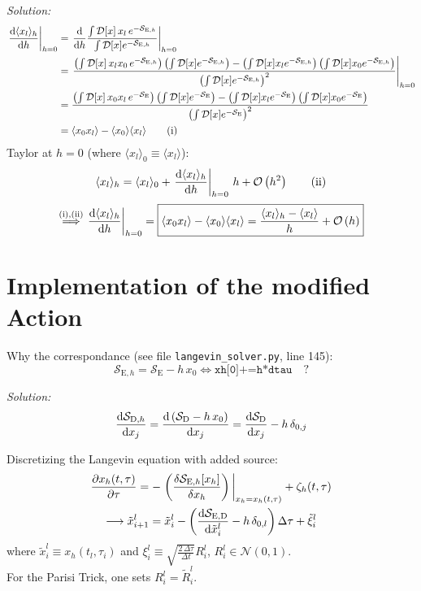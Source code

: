 \documentclass[11pt,a4paper]{scrartcl}
\newcommand{\SD}{\ensuremath{\mathcal{S}_{\mathrm{D}}}}
\newcommand{\SDh}{\mathcal{S}_{\mathrm{D},h}}
\newcommand{\avg}[1]{\langle#1\rangle}
\newcommand{\SE}{\mathcal{S}_{\mathrm{E}}}
\newcommand{\SEh}{\mathcal{S}_{\mathrm{E},h}}
\newcommand{\pathinth}[1]{\int\mathcal{D}[x]#1e^{-\SEh}}
\newcommand{\pathint}[1]{\int\mathcal{D}[x]#1e^{-\SE}}
\newcommand{\BigO}[1]{\mathcal{O}\left(#1\right)}
\newcommand{\SED}{\mathcal{S}_{\mathrm{E,D}}}
\newcommand{\xt}{\ensuremath{\tilde{x}}}
\newcommand{\xh}{\ensuremath{x_{h}}}
\begin{document}
\emph{Solution:}
\begin{align*}
    \eval{\dv{\avg{x_l}_h}{h}}_{h=0} &=
    \eval{\dv{h}\frac{\pathinth{\,x_l\,}}{\pathinth{}}}_{h=0} \\ &=
    \eval{\frac{\left(\pathinth{\,x_l x_0\,}\right)\left(\pathinth{}\right)
    -\left(\pathinth{x_l}\right)\left(\pathinth{x_0}\right)}
    {\left(\pathinth{}\right)^2}}_{h=0} \\ &=
    \frac{\left(\pathint{\,x_0 x_l\,}\right)\left(\pathint{}\right)
    -\left(\pathint{x_l}\right)\left(\pathint{x_0}\right)}
    {\left(\pathint{}\right)^2} \\ &=
    \avg{x_0 x_l}-\avg{x_0}\avg{x_l} \tag{i}
\end{align*}
Taylor at $h=0$ (where $\avg{x_l}_0\equiv\avg{x_l}$):
\begin{equation*}
    \avg{x_l}_h=\avg{x_l}_0+\eval{\dv{\avg{x_l}_h}{h}}_{h=0}\,h+\BigO{h^2}
    \tag{ii}
\end{equation*}
\begin{equation*}
    \overset{(\mathrm{i}),(\mathrm{ii})}{\implies}\eval{\dv{\avg{x_l}_h}{h}}_{h=0}
    =\boxed{\avg{x_0 x_l}-\avg{x_0}\avg{x_l}
    =\frac{\avg{x_l}_h-\avg{x_l}}{h}+\BigO{h}}
\end{equation*}


\section*{Implementation of the modified Action}
Why the correspondance (see file \texttt{langevin\_solver.py}, line 145):
\begin{equation*}
    \SEh=\SE-h\,x_0 \iff \texttt{xh[0]+=h*dtau}\quad?
\end{equation*}

\emph{Solution:}
\begin{equation*}
    \dv{\SDh}{x_j}=\dv{\left(\SD-h\,x_0\right)}{x_j}=\dv{\SD}{x_j}-h\,\delta_{0,j}
\end{equation*}

Discretizing the Langevin equation with added source:
\begin{gather*}
    \pdv{\xh(t,\tau)}{\tau}=-\eval{\left(\fdv{\SEh[\xh]}{\xh}\right)}_{\xh=\xh(t,\tau)}+\zeta_h(t,\tau) \\
    \longrightarrow
    \xt_{i+1}^{l}=\xt_{i}^{l}-\left(\dv{\SED}{\xt_{i}^{l}}-h\,\delta_{0,l}\right)\Delta{\tau}+\tilde{\xi}_{i}^{l}
\end{gather*}
where $\xt_{i}^{l}\equiv\xh(t_l,\tau_i)$ and $\xi_{i}^{l}\equiv\sqrt{\frac{2\,\Delta{\tau}}{\Delta{t}}}R_{i}^{l}$, $R_{i}^{l}\in\mathcal{N}(0,1)$. \\
For the Parisi Trick, one sets $R_{i}^{l}=\tilde{R}_{i}^{l}$.
\end{document}
